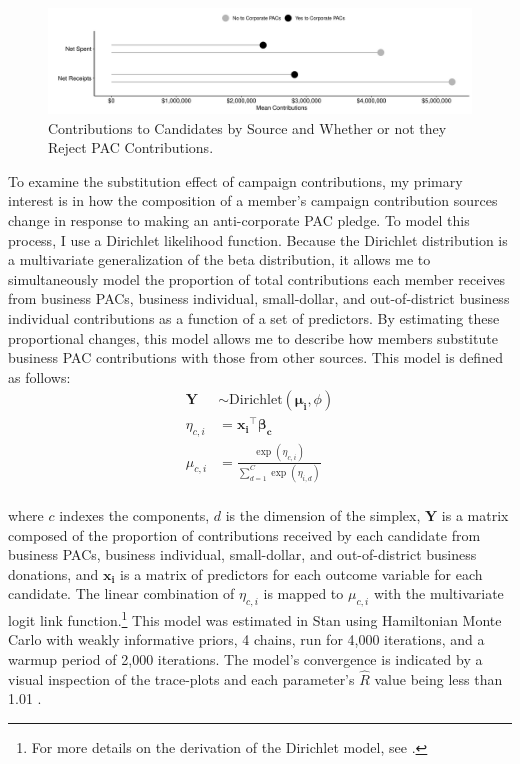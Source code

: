\documentclass[12pt]{article}
\begin{document}
\begin{figure}[!ht]
    \centering
    \includegraphics[width=0.9\linewidth]{spending_candy.pdf}
    \caption{Contributions to Candidates by Source and Whether or not they Reject PAC Contributions.}
    \label{fig: total money}
\end{figure}

To examine the substitution effect of campaign contributions, my primary interest is in how the composition of a member's campaign contribution sources change in response to making an anti-corporate PAC pledge. To model this process, I use a Dirichlet likelihood function. Because the Dirichlet distribution is a multivariate generalization of the beta distribution, it allows me to simultaneously model the proportion of total contributions each member receives from business PACs, business individual, small-dollar, and out-of-district business individual contributions as a function of a set of predictors. By estimating these proportional changes, this model allows me to describe how members substitute business PAC contributions with those from other sources. This model is defined as follows: 
$$
\begin{aligned}
\bm{Y} &\sim \text{Dirichlet}(\bm{\mu_i}, \phi) \\
\eta_{c,i} &= \bm{x_i}^\top \bm{\beta_c} \\
\mu_{c,i} &= \frac{\exp(\eta_{c,i})}{\sum^{C}_{d=1}\exp(\eta_{i,d})} \\
\end{aligned}
$$

\noindent where $c$ indexes the components, $d$ is the dimension of the simplex, $\bm{Y}$ is a matrix composed of the proportion of contributions received by each candidate from business PACs, business individual, small-dollar, and out-of-district business donations, and $\bm{x_i}$ is a matrix of predictors for each outcome variable for each candidate. The linear combination of $\eta_{c,i}$ is mapped to $\mu_{c,i}$ with the multivariate logit link function.\footnote{For more details on the derivation of the Dirichlet model, see \citet{hijazi2009}.} This model was estimated in Stan using Hamiltonian Monte Carlo with weakly informative priors, 4 chains, run for 4,000 iterations, and a warmup period of 2,000 iterations. The model's convergence is indicated by a visual inspection of the trace-plots and each parameter's $\hat{R}$ value being less than 1.01 \citep{standevelopmentteam2021, burkner2017a}. 
\end{document}
